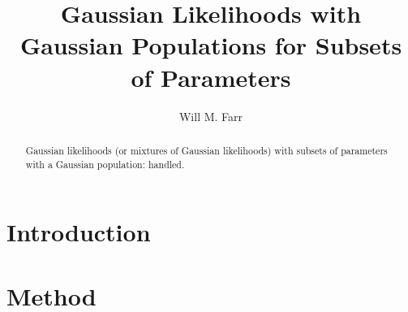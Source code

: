 \documentclass[modern]{aastex631}
\begin{document}
\title{Gaussian Likelihoods with Gaussian Populations for Subsets of Parameters}

\author{Will M. Farr}

\begin{abstract}
    Gaussian likelihoods (or mixtures of Gaussian likelihoods) with subsets of
    parameters with a Gaussian population: handled.
\end{abstract}

\section{Introduction}
\label{sec:intro}

\section{Method}
\label{sec:method}
\end{document}

